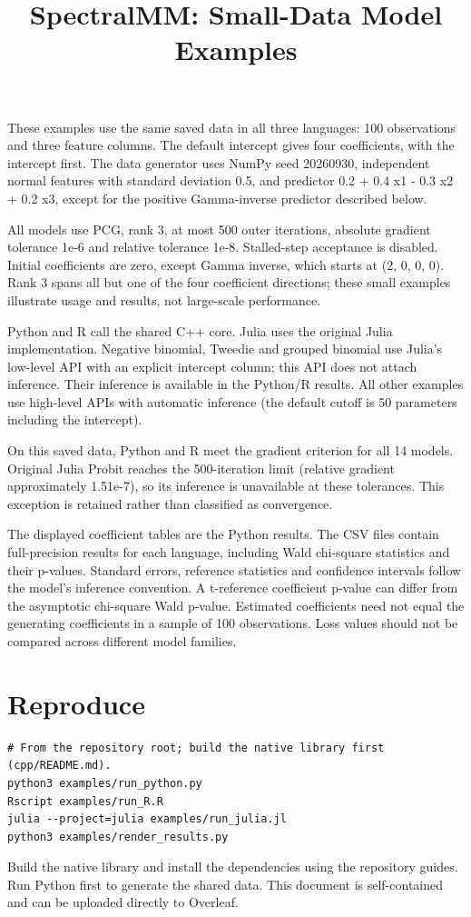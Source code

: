 \documentclass[11pt]{article}
\title{SpectralMM: Small-Data Model Examples}
\author{}
\date{}
\begin{document}
\maketitle
These examples use the same saved data in all three languages: 100 observations and three feature columns. The default intercept gives four coefficients, with the intercept first. The data generator uses NumPy seed 20260930, independent normal features with standard deviation 0.5, and predictor 0.2 + 0.4 x1 - 0.3 x2 + 0.2 x3, except for the positive Gamma-inverse predictor described below.

All models use PCG, rank 3, at most 500 outer iterations, absolute gradient tolerance 1e-6 and relative tolerance 1e-8. Stalled-step acceptance is disabled. Initial coefficients are zero, except Gamma inverse, which starts at (2, 0, 0, 0). Rank 3 spans all but one of the four coefficient directions; these small examples illustrate usage and results, not large-scale performance.

Python and R call the shared C++ core. Julia uses the original Julia implementation. Negative binomial, Tweedie and grouped binomial use Julia's low-level API with an explicit intercept column; this API does not attach inference. Their inference is available in the Python/R results. All other examples use high-level APIs with automatic inference (the default cutoff is 50 parameters including the intercept).

On this saved data, Python and R meet the gradient criterion for all 14 models. Original Julia Probit reaches the 500-iteration limit (relative gradient approximately 1.51e-7), so its inference is unavailable at these tolerances. This exception is retained rather than classified as convergence.

The displayed coefficient tables are the Python results. The CSV files contain full-precision results for each language, including Wald chi-square statistics and their p-values. Standard errors, reference statistics and confidence intervals follow the model's inference convention. A t-reference coefficient p-value can differ from the asymptotic chi-square Wald p-value. Estimated coefficients need not equal the generating coefficients in a sample of 100 observations. Loss values should not be compared across different model families.
\section{Reproduce}
\begin{lstlisting}
# From the repository root; build the native library first (cpp/README.md).
python3 examples/run_python.py
Rscript examples/run_R.R
julia --project=julia examples/run_julia.jl
python3 examples/render_results.py
\end{lstlisting}
Build the native library and install the dependencies using the repository guides. Run Python first to generate the shared data. This document is self-contained and can be uploaded directly to Overleaf.
\end{document}
